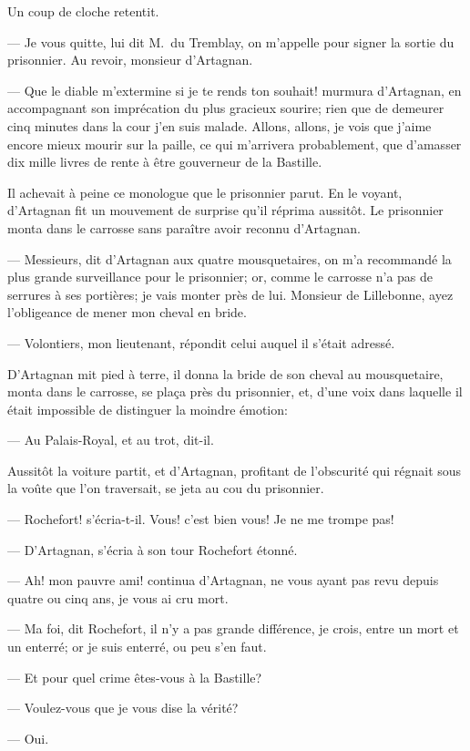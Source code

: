 Un coup de cloche retentit.

— Je vous quitte, lui dit M.~du Tremblay, on m'appelle pour signer la sortie du prisonnier. Au revoir, monsieur d'Artagnan.

— Que le diable m'extermine si je te rends ton souhait! murmura d'Artagnan, en accompagnant son imprécation du plus gracieux sourire; rien que de demeurer cinq minutes dans la cour j'en suis malade. Allons, allons, je vois que j'aime encore mieux mourir sur la paille, ce qui m'arrivera probablement, que d'amasser dix mille livres de rente à être gouverneur de la Bastille.

Il achevait à peine ce monologue que le prisonnier parut. En le voyant, d'Artagnan fit un mouvement de surprise qu'il réprima aussitôt. Le prisonnier monta dans le carrosse sans paraître avoir reconnu d'Artagnan.

— Messieurs, dit d'Artagnan aux quatre mousquetaires, on m'a recommandé la plus grande surveillance pour le prisonnier; or, comme le carrosse n'a pas de serrures à ses portières; je vais monter près de lui. Monsieur de Lillebonne, ayez l'obligeance de mener mon cheval en bride.

— Volontiers, mon lieutenant, répondit celui auquel il s'était adressé.

D'Artagnan mit pied à terre, il donna la bride de son cheval au mousquetaire, monta dans le carrosse, se plaça près du prisonnier, et, d'une voix dans laquelle il était impossible de distinguer la moindre émotion:

— Au Palais-Royal, et au trot, dit-il.

Aussitôt la voiture partit, et d'Artagnan, profitant de l'obscurité qui régnait sous la voûte que l'on traversait, se jeta au cou du prisonnier.

— Rochefort! s'écria-t-il. Vous! c'est bien vous! Je ne me trompe pas!

— D'Artagnan, s'écria à son tour Rochefort étonné.

— Ah! mon pauvre ami! continua d'Artagnan, ne vous ayant pas revu depuis quatre ou cinq ans, je vous ai cru mort.

— Ma foi, dit Rochefort, il n'y a pas grande différence, je crois, entre un mort et un enterré; or je suis enterré, ou peu s'en faut.

— Et pour quel crime êtes-vous à la Bastille?

— Voulez-vous que je vous dise la vérité?

— Oui.

